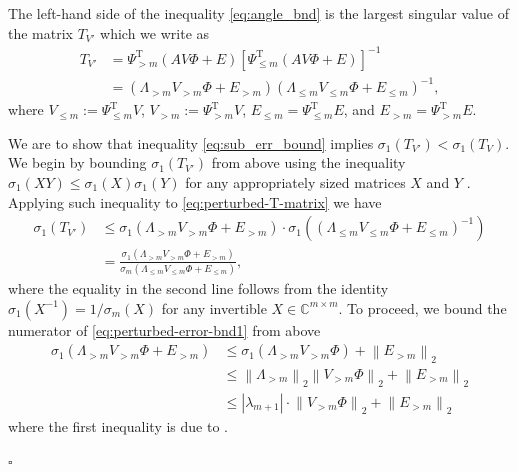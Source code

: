 \documentclass[10pt,preprint]{elsarticle}
\newenvironment{proof}{{\noindent \bf \em Proof:}}{\hfill$\square$}
\renewcommand{\top}{\text{T}}
\newcommand{\norm}[1]{\left \lVert #1 \right \rVert }
\newcommand{\Plm}{\Psi_{\le m}}
\newcommand{\Pgm}{\Psi_{> m}}
\newcommand{\Llm}{\Lambda_{\le m}}
\newcommand{\Lgm}{\Lambda_{> m}}
\begin{document}
\begin{proof}
The left-hand side of the inequality \eqref{eq:angle_bnd} is the largest singular value of the matrix $T_{V'}$ which we write as 
\begin{equation} \label{eq:perturbed-T-matrix}
\begin{aligned}
T_{V'}
&= 
\Pgm^\top(AV\Phi+E) \left[\Plm^\top\left(AV\Phi+E\right)\right]^{-1} 
\\
&= 
\left(\Lgm V_{>m} \Phi + E_{>m}\right) \left(\Llm V_{\leq m} \Phi + E_{\leq m}\right)^{-1},
\end{aligned}
\end{equation}
where $V_{\leq m} := \Psi_{\leq m}^{\top} V$,  $V_{>m} := \Psi_{>m}^{\top} V$,
$E_{\leq m} = \Plm^\top E$, and $E_{>m} = \Pgm^\top E$. 

We are to show that inequality \eqref{eq:sub_err_bound} implies $\sigma_1(T_{V'}) < \sigma_1(T_V)$. We begin by bounding $\sigma_1(T_{V'})$ from above using the inequality $\sigma_1(XY) \leq \sigma_1(X) \sigma_1(Y)$ for any appropriately sized matrices $X$ and $Y$ \cite{wang1992svBounds}. Applying such inequality to \eqref{eq:perturbed-T-matrix} we have 
\begin{equation} \label{eq:perturbed-error-bnd1}
\begin{aligned}
\sigma_1(T_{V'})
&\le
\sigma_1 (\Lgm V_{>m} \Phi + E_{>m}) \cdot \sigma_1 \left( (\Llm V_{\leq m} \Phi + E_{\leq m})^{-1}  \right)
\\
&=
\frac{\sigma_1 \left(\Lgm V_{>m} \Phi + E_{>m}\right)}{\sigma_m \left( \Llm V_{\leq m} \Phi + E_{\leq m} \right)},
\end{aligned}
\end{equation}
where the equality in the second line follows from the identity $\sigma_1(X^{-1}) = 1 / \sigma_m(X)$ for any invertible $X \in \mathbb{C}^{m \times m}$. 
%
To proceed, we bound the numerator of \eqref{eq:perturbed-error-bnd1} from above 
\begin{equation}
\begin{aligned}
\sigma_1\left(\Lgm V_{>m} \Phi + E_{>m}\right) 
&\leq \sigma_1\left(\Lgm V_{>m} \Phi\right) + \norm{E_{>m}}_2 \\
&\leq 
\norm{\Lambda_{>m}}_2 \norm{V_{>m} \Phi}_2 + \norm{E_{>m}}_2 \\
&\leq |\lambda_{m+1}| \cdot \norm{V_{>m} \Phi}_2 + \norm{E_{>m}}_2 
\end{aligned}
\end{equation}
where the first inequality is due to \cite[Theorem 1]{stewart1998perturbation}. 

\end{proof}
\end{document}
